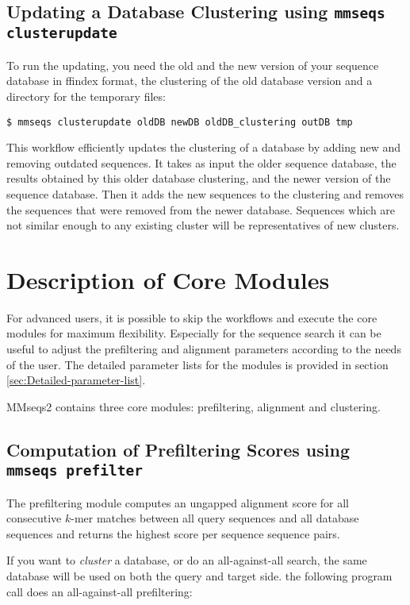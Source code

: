 \documentclass[11pt,a4paper]{scrreprt}
\begin{document}
\subsection{Updating a Database Clustering using \texttt{mmseqs clusterupdate}}
To run the updating, you need the old and the new version of your sequence database in ffindex format, the clustering of the old database version and a directory for the temporary files:

\begin{verbatim}
$ mmseqs clusterupdate oldDB newDB oldDB_clustering outDB tmp
\end{verbatim}

This workflow efficiently updates the clustering of a database by adding new and removing outdated sequences. It takes as input the older sequence database, the results obtained by this older database clustering, and the newer version of the sequence database. Then it adds the new sequences to the clustering and removes the sequences that were removed from the newer database. Sequences which are not similar enough to any existing cluster will be representatives of new clusters.
\section{Description of Core Modules}
For advanced users, it is possible to skip the workflows and execute the core modules for maximum flexibility. Especially for the sequence search it can be useful to adjust the prefiltering and alignment parameters according to the needs of the user. The detailed parameter lists for the modules is provided in section \ref{sec:Detailed-parameter-list}.

MMseqs2 contains three core modules: prefiltering, alignment and clustering.
\subsection{Computation of Prefiltering Scores using \texttt{mmseqs prefilter}} \label{sub:Prefiltering}
The prefiltering module computes an ungapped alignment score for all consecutive $k$-mer matches between all query sequences and all database sequences and returns the highest score per sequence sequence pairs. 

If you want to \emph{cluster} a database, or do an all-against-all search, the same database will be used on both the query and target side. the following program call does an all-against-all prefiltering: 
\end{document}
